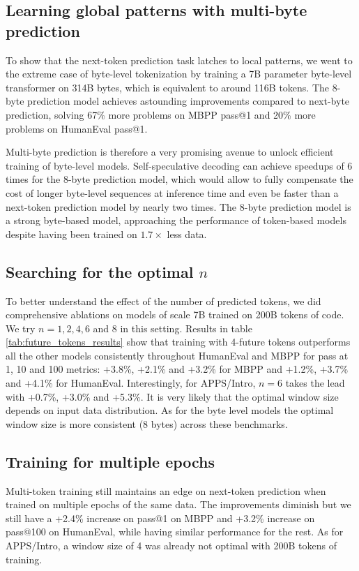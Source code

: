 \documentclass{article}
\theoremstyle{plain}
\theoremstyle{definition}
\theoremstyle{remark}
\begin{document}
\subsection{Learning global patterns with multi-byte prediction}
\label{sect:byte-level}
To show that the next-token prediction task latches to local patterns, we went to the extreme case of byte-level tokenization by training a 7B parameter byte-level transformer  on 314B bytes, which is equivalent to around 116B tokens. The 8-byte prediction model achieves astounding improvements compared to next-byte prediction, solving 67\% more problems on MBPP pass@1 and 20\% more problems on HumanEval pass@1. 

Multi-byte prediction is therefore a very promising avenue to unlock efficient training of byte-level models. Self-speculative decoding can achieve speedups of 6 times for the 8-byte prediction model, which would allow to fully compensate the cost of longer byte-level sequences at inference time and even be faster than a next-token prediction model by nearly two times. The 8-byte prediction model is a strong byte-based model, approaching the performance of token-based models despite having been trained on $1.7\times$ less data.

\subsection{Searching for the optimal $n$}
\label{sect:optimal-future}

To better understand the effect of the number of predicted tokens, we did comprehensive ablations on models of scale 7B trained on 200B tokens of code. We try $n=1,2,4,6$ and $8$ in this setting. Results in table \ref{tab:future_tokens_results} show that training with 4-future tokens outperforms all the other models consistently throughout HumanEval and MBPP for pass at 1, 10 and 100 metrics: +3.8\%, +2.1\% and +3.2\% for MBPP and +1.2\%, +3.7\% and +4.1\% for HumanEval. Interestingly, for APPS/Intro, $n=6$ takes the lead with +0.7\%, +3.0\% and +5.3\%. It is very likely that the optimal window size depends on input data distribution. As for the byte level models the optimal window size is more consistent (8 bytes) across these benchmarks. 

\subsection{Training for multiple epochs}
\label{sect:multi-epoch}
Multi-token training still maintains an edge on next-token prediction when trained on multiple epochs of the same data. The improvements diminish but we still have a +2.4\% increase on pass@1 on MBPP and +3.2\% increase on pass@100 on HumanEval, while having similar performance for the rest. As for APPS/Intro, a window size of 4 was already not optimal with 200B tokens of training. 
\end{document}

